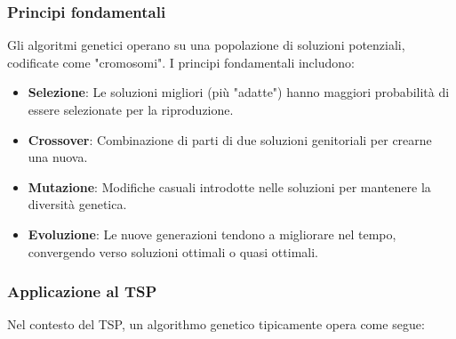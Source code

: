 \subsubsection{Principi fondamentali}

Gli algoritmi genetici operano su una popolazione di soluzioni potenziali, codificate come "cromosomi". I principi fondamentali includono:

\begin{itemize}
	\item \textbf{Selezione}: Le soluzioni migliori (più "adatte") hanno maggiori probabilità di essere selezionate per la riproduzione.
	\item \textbf{Crossover}: Combinazione di parti di due soluzioni genitoriali per crearne una nuova.
	\item \textbf{Mutazione}: Modifiche casuali introdotte nelle soluzioni per mantenere la diversità genetica.
	\item \textbf{Evoluzione}: Le nuove generazioni tendono a migliorare nel tempo, convergendo verso soluzioni ottimali o quasi ottimali.
\end{itemize}

\subsubsection{Applicazione al \Gls{TSP}}

Nel contesto del \Gls{TSP}, un algorithmo genetico tipicamente opera come segue:

